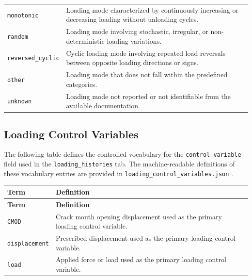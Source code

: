 \documentclass[11pt]{book}
\begin{document}
{\begin{longtable}{p{}p{}}
\texttt{monotonic} &
Loading mode characterized by continuously increasing or decreasing loading without unloading cycles. \\

\texttt{random} &
Loading mode involving stochastic, irregular, or non-deterministic loading variations. \\

\texttt{reversed\_cyclic} &
Cyclic loading mode involving repeated load reversals between opposite loading directions or signs. \\

\texttt{other} &
Loading mode that does not fall within the predefined categories. \\

\texttt{unknown} &
Loading mode not reported or not identifiable from the available documentation. \\

\hline
\end{longtable}

\subsection{Loading Control Variables}
\label{vocab:loading_control_variable_list}

The following table defines the controlled vocabulary for the \texttt{control\_variable} field used in the \texttt{loading\_histories} tab. The machine-readable definitions of these vocabulary entries are provided in  \texttt{loading\_control\_variables.json} .

\begin{longtable}{p{}p{}}
\hline
\textbf{Term} & \textbf{Definition} \\
\hline
\endfirsthead

\hline
\textbf{Term} & \textbf{Definition} \\
\hline
\endhead

\texttt{CMOD} &
Crack mouth opening displacement used as the primary loading control variable. \\

\texttt{displacement} &
Prescribed displacement used as the primary loading control variable. \\

\texttt{load} &
Applied force or load used as the primary loading control variable. \\


\end{longtable}}
\end{document}
